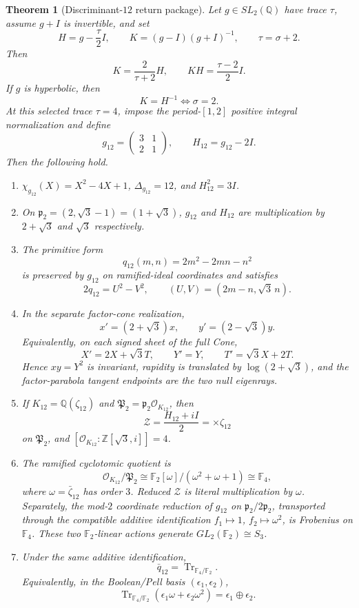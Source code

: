 \documentclass[11pt]{article}
\newtheorem{theorem}{Theorem}[section]
\theoremstyle{remark}
\newcommand{\Q}{\mathbb Q}
\newcommand{\Z}{\mathbb Z}
\newcommand{\F}{\mathbb F}
\newcommand{\OO}{\mathcal O}
\newcommand{\Tr}{\operatorname{Tr}}
\begin{document}
\begin{theorem}[Discriminant-$12$ return package]
\label{thm:main}
Let $g\in SL_2(\Q)$ have trace $\tau$, assume $g+I$ is invertible, and set
\[
H=g-\frac\tau2I,
\qquad K=(g-I)(g+I)^{-1},
\qquad \tau=\sigma+2.
\]
Then
\[
K=\frac{2}{\tau+2}H,
\qquad KH=\frac{\tau-2}{2}I.
\]
If $g$ is hyperbolic, then
\[
K=H^{-1}\iff\sigma=2.
\]
At this selected trace $\tau=4$, impose the period-$[1,2]$ positive integral
normalization and define
\[
g_{12}=\begin{pmatrix}3&1\\2&1\end{pmatrix},
\qquad
H_{12}=g_{12}-2I.
\]
Then the following hold.
\begin{enumerate}[label=(\roman*)]
\item $\chi_{g_{12}}(X)=X^2-4X+1$, $\Delta_{g_{12}}=12$, and
$H_{12}^2=3I$.
\item On $\mathfrak p_2=(2,\sqrt3-1)=(1+\sqrt3)$, $g_{12}$ and $H_{12}$
are multiplication by $2+\sqrt3$ and $\sqrt3$ respectively.
\item The primitive form
\[
q_{12}(m,n)=2m^2-2mn-n^2
\]
is preserved by $g_{12}$ on ramified-ideal coordinates and satisfies
\[
2q_{12}=U^2-V^2,
\qquad (U,V)=(2m-n,\sqrt3\,n).
\]
\item In the separate factor-cone realization,
\[
x'=(2+\sqrt3)x,
\qquad y'=(2-\sqrt3)y.
\]
Equivalently, on each signed sheet of the full Cone,
\[
\boxed{X'=2X+\sqrt3T,\qquad Y'=Y,\qquad T'=\sqrt3X+2T.}
\]
Hence $xy=Y^2$ is invariant, rapidity is translated by
$\log(2+\sqrt3)$, and the factor-parabola tangent endpoints are the two null
eigenrays.
\item If $K_{12}=\Q(\zeta_{12})$ and
$\mathfrak P_2=\mathfrak p_2\OO_{K_{12}}$, then
\[
\mathcal Z=\frac{H_{12}+iI}{2}=\times\zeta_{12}
\]
on $\mathfrak P_2$, and
$[\OO_{K_{12}}:\Z[\sqrt3,i]]=4$.
\item The ramified cyclotomic quotient is
\[
\OO_{K_{12}}/\mathfrak P_2
\cong \F_2[\omega]/(\omega^2+\omega+1)
\cong\F_4,
\]
where $\omega=\bar\zeta_{12}$ has order $3$.  Reduced $\mathcal Z$ is
literal multiplication by $\omega$.  Separately, the mod-$2$ coordinate
reduction of $g_{12}$ on $\mathfrak p_2/2\mathfrak p_2$, transported through
the compatible additive identification $f_1\mapsto1$, $f_2\mapsto\omega^2$,
is Frobenius on $\F_4$.  These two $\F_2$-linear actions generate
$GL_2(\F_2)\cong S_3$.
\item Under the same additive identification,
\[
\boxed{\bar q_{12}=\Tr_{\F_4/\F_2}.}
\]
Equivalently, in the Boolean/Pell basis
$(\epsilon_1,\epsilon_2)$,
\[
\Tr_{\F_4/\F_2}(\epsilon_1\omega+\epsilon_2\omega^2)
=\epsilon_1\oplus\epsilon_2.
\]
\end{enumerate}
\end{theorem}
\end{document}
